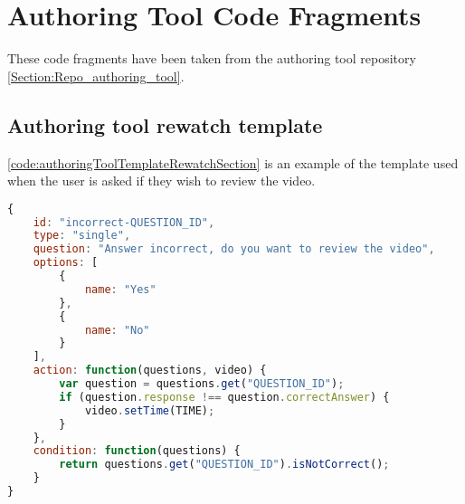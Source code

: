 \section{Authoring Tool Code Fragments}

These code fragments have been taken from the authoring tool repository \autoref{Section:Repo_authoring_tool}.

\subsection{Authoring tool rewatch template}

\autoref{code:authoringToolTemplateRewatchSection} is an example of the template used when the user is asked if they wish to review the video.

\begin{lstlisting}[language=javascript,caption={Base template for a question asking if the viewer wishes to review the video section they answered incorrectly},label={code:authoringToolTemplateRewatchSection} ]
{
	id: "incorrect-QUESTION_ID",
	type: "single",
	question: "Answer incorrect, do you want to review the video",
	options: [
		{
			name: "Yes"
		},
		{
			name: "No"
		}
	],
	action: function(questions, video) {
		var question = questions.get("QUESTION_ID");
		if (question.response !== question.correctAnswer) {
			video.setTime(TIME);
		}
	},
	condition: function(questions) {
		return questions.get("QUESTION_ID").isNotCorrect();
	}
}
\end{lstlisting}